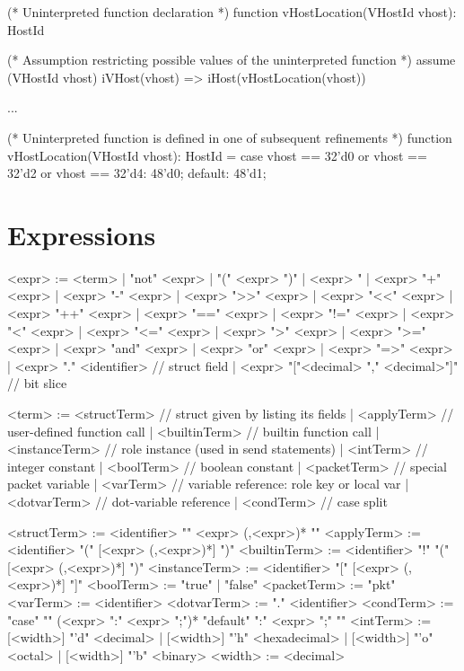 \documentclass{report}
\begin{document}
\begin{ccnlisting}{}
(* Uninterpreted function declaration *)
function vHostLocation(VHostId vhost): HostId

(* Assumption restricting possible values of the uninterpreted function *)
assume (VHostId vhost) iVHost(vhost) => iHost(vHostLocation(vhost))

...

(* Uninterpreted function is defined in one of subsequent refinements *)
function vHostLocation(VHostId vhost): HostId = case {
        vhost == 32'd0 or vhost == 32'd2 or vhost == 32'd4: 48'd0;
        default: 48'd1;
    }
\end{ccnlisting}

\section{Expressions}


\begin{bnflisting}{}
<expr> := <term>
        | "not" <expr>
        | "(" <expr> ")"
        | <expr> "%
        | <expr> "+" <expr>
        | <expr> "-" <expr>
        | <expr> ">>" <expr>
        | <expr> "<<" <expr>
        | <expr> "++" <expr>
        | <expr> "==" <expr>
        | <expr> "!=" <expr>
        | <expr> "<" <expr>
        | <expr> "<=" <expr>
        | <expr> ">" <expr>
        | <expr> ">=" <expr>
        | <expr> "and" <expr>
        | <expr> "or" <expr>
        | <expr> "=>" <expr>
        | <expr> "." <identifier> // struct field
        | <expr> "["<decimal> "," <decimal>"]" // bit slice
\end{bnflisting}

\begin{bnflisting}{}
<term> := <structTerm>   // struct given by listing its fields
        | <applyTerm>    // user-defined function call
        | <builtinTerm>  // builtin function call
        | <instanceTerm> // role instance (used in send statements)
        | <intTerm>      // integer constant
        | <boolTerm>     // boolean constant
        | <packetTerm>   // special packet variable
        | <varTerm>      // variable reference: role key or local var
        | <dotvarTerm>   // dot-variable reference
        | <condTerm>     // case split
\end{bnflisting}

\begin{bnflisting}{}
<structTerm>   := <identifier> "{" <expr> (,<expr>)* "}"
<applyTerm>    := <identifier> "(" [<expr> (,<expr>)*] ")"
<builtinTerm>  := <identifier> "!" "(" [<expr> (,<expr>)*] ")"
<instanceTerm> := <identifier> "[" [<expr> (,<expr>)*] "]"
<boolTerm>     := "true" | "false"
<packetTerm>   := "pkt"
<varTerm>      := <identifier>
<dotvarTerm>   := "." <identifier>
<condTerm>     := "case" "{"
                  (<expr> ":" <expr> ";")*
                  "default" ":" <expr> ";"
                  "}"
<intTerm>      := [<width>] "'d" <decimal>
                | [<width>] "'h" <hexadecimal>
                | [<width>] "'o" <octal>
                | [<width>] "'b" <binary>
<width> := <decimal>
\end{bnflisting}
\end{document}
